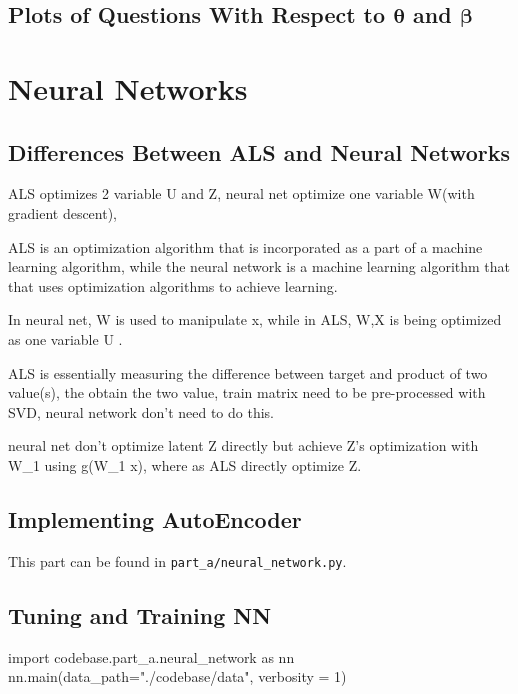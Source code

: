 \documentclass{article}
\begin{document}
    \subsection{Plots of Questions With Respect to $\bm{\theta}$ and $\bm{\beta}$}


    \pagebreak

    \section{Neural Networks}
    \subsection{Differences Between ALS and Neural Networks}
    
    ALS optimizes 2 variable U and Z, neural net optimize one variable W(with gradient descent),

    ALS is an optimization algorithm that is incorporated as a part of a machine learning algorithm, while the neural network is a machine learning algorithm that that uses optimization algorithms to achieve learning.

    In neural net, W is used to manipulate x, while in ALS, W,X is being optimized as one variable U .

    ALS is essentially measuring the difference between target and product of two value(s), the obtain the two value, train matrix need to be pre-processed with SVD, neural network don't need to do this.

    neural net don't optimize latent Z directly but achieve Z's optimization with W_1 using g(W_1 x), where as ALS directly optimize Z.


    \subsection{Implementing AutoEncoder}
    This part can be found in \verb|part_a/neural_network.py|.

    \subsection{Tuning and Training NN}
    \begin{pylabblock}
        import codebase.part_a.neural_network as nn
        nn.main(data_path="./codebase/data", verbosity = 1)
    \end{pylabblock}
    \printpythontex[verb]
\end{document}

